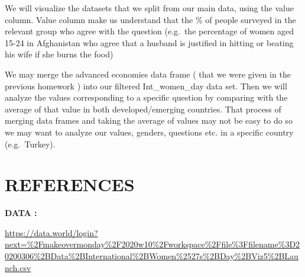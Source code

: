 \documentclass[
]{article}
\begin{document}
We will visualize the datasets that we split from our main data, using
the value column. Value column make us understand that the \% of people
surveyed in the relevant group who agree with the question (e.g.~the
percentage of women aged 15-24 in Afghanistan who agree that a husband
is justified in hitting or beating his wife if she burns the food)

We may merge the advanced economies data frame ( that we were given in
the previous homework ) into our filtered Int\_women\_day data set. Then
we will analyze the values corresponding to a specific question by
comparing with the average of that value in both developed/emerging
countries. That process of merging data frames and taking the average of
values may not be easy to do so we may want to analyze our values,
genders, questions etc. in a specific country (e.g.~Turkey).

\newpage

\hypertarget{references}{%
\section{REFERENCES}\label{references}}

\textbf{DATA :}

\url{https://data.world/login?next=\%2Fmakeovermonday\%2F2020w10\%2Fworkspace\%2Ffile\%3Ffilename\%3D20200306\%2BData\%2BInternational\%2BWomen\%2527s\%2BDay\%2BViz5\%2BLaunch.csv}
\end{document}
